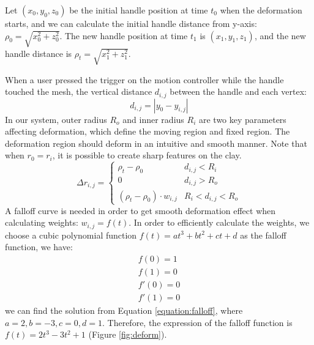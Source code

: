 \documentclass{svjour3}                     %
\begin{document}
Let $(x_{0},y_{0},z_{0})$ be the initial handle position at time $t_{0}$ when the deformation starts, and we can calculate the initial handle distance from y-axis: $\rho_{0} = \sqrt{x_{0}^2 + z_{0}^2}$. The new handle position at time $t_{1}$ is $(x_{1},y_{1},z_{1})$, and the new handle distance is $\rho_{t} = \sqrt{x_{1}^2 + z_{1}^2}$.

When a user pressed the trigger on the motion controller while the handle touched the mesh, the vertical distance $d_{i,j}$ between the handle and each vertex:
\begin{equation}
d_{i,j} = |y_{0} - y_{i,j}|
\end{equation}
In our system, outer radius $R_{o}$ and inner radius $R_{i}$ are two key parameters affecting deformation, which define the moving region and fixed region. The deformation region should deform in an intuitive and smooth manner. Note that when $r_{0} = r_{i}$, it is possible to create sharp features on the clay.
\begin{equation}
\Delta r_{i,j} = \begin{cases}
\rho_{t} - \rho_{0} &  d_{i,j} < R_{i} \\
0 &  d_{i,j} > R_{o} \\
(\rho_{t} - \rho_{0}) \cdot w_{i,j} &  R_{i} < d_{i,j} < R_{o}
\end{cases}
\end{equation}
A falloff curve is needed in order to get smooth deformation effect when calculating weights: $w_{i,j} = f(t)$. In order to efficiently calculate the weights, we choose a cubic polynomial function $f(t) = at^3 + bt^2 + ct + d$ as the falloff function, we have:
\begin{equation}
\begin{aligned}
\label{equation:falloff}
f(0) = 1 \\
f(1) = 0 \\ 
f'(0) = 0 \\
f'(1) = 0
\end{aligned}
\end{equation}
we can find the solution from Equation \ref{equation:falloff}, where 
$a = 2, b = -3, c = 0, d = 1$. Therefore, the expression of the falloff function is $f(t) = 2t^3 - 3t^2 + 1$ (Figure \ref{fig:deform}).
\end{document}
